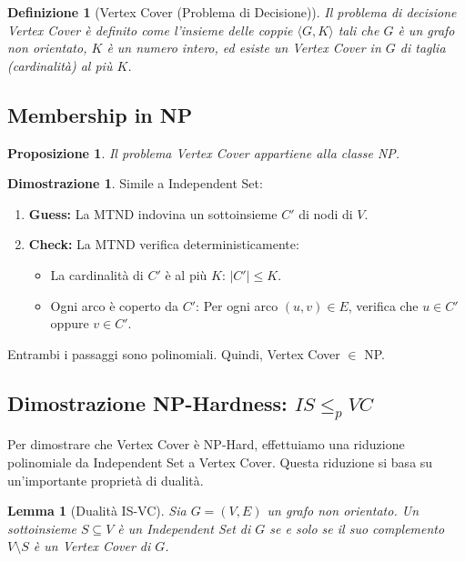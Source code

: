 \documentclass[a4paper, 11pt]{book} %
\newtheorem{definition}[theorem]{Definizione}
\newtheorem{lemma}[theorem]{Lemma}
\newtheorem{proposition}[theorem]{Proposizione}
\theoremstyle{definition}
\newtheorem*{proof*}{Dimostrazione}
\begin{document}
\begin{definition}[Vertex Cover (Problema di Decisione)]
Il problema di decisione \emph{Vertex Cover} è definito come l'insieme delle coppie $\langle G, K \rangle$ tali che $G$ è un grafo non orientato, $K$ è un numero intero, ed esiste un Vertex Cover in $G$ di taglia (cardinalità) al più $K$.
\end{definition}

\subsection{Membership in NP}

\begin{proposition}
Il problema \emph{Vertex Cover} appartiene alla classe NP.
\end{proposition}

\begin{proof*}
Simile a Independent Set:
\begin{enumerate}
    \item \textbf{Guess:} La MTND indovina un sottoinsieme $C'$ di nodi di $V$.
    \item \textbf{Check:} La MTND verifica deterministicamente:
    \begin{itemize}
        \item La cardinalità di $C'$ è al più $K$: $|C'| \le K$.
        \item Ogni arco è coperto da $C'$: Per ogni arco $(u, v) \in E$, verifica che $u \in C'$ oppure $v \in C'$.
    \end{itemize}
\end{enumerate}
Entrambi i passaggi sono polinomiali. Quindi, Vertex Cover $\in$ NP.
\end{proof*}

\subsection{Dimostrazione NP-Hardness: $IS \le_p VC$}

Per dimostrare che Vertex Cover è NP-Hard, effettuiamo una riduzione polinomiale da Independent Set a Vertex Cover. Questa riduzione si basa su un'importante proprietà di dualità.

\begin{lemma}[Dualità IS-VC]
Sia $G=(V, E)$ un grafo non orientato. Un sottoinsieme $S \subseteq V$ è un Independent Set di $G$ se e solo se il suo complemento $V \setminus S$ è un Vertex Cover di $G$.
\end{lemma}
\end{document}
